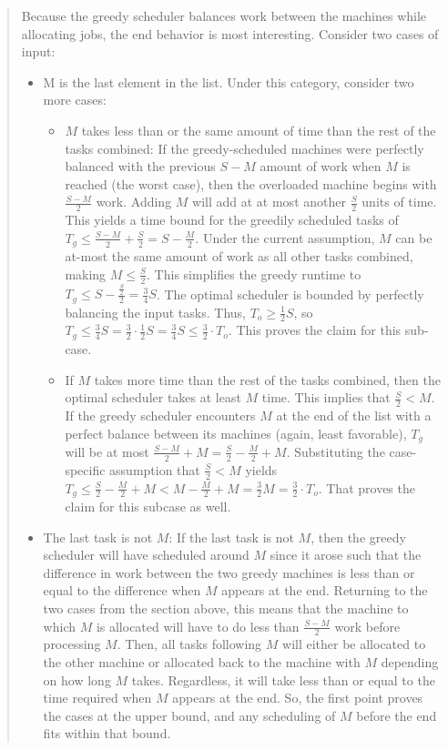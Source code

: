 \documentclass[11pt]{article}
\begin{document}
\begin{enumerate}
\begin{enumerate}
\begin{quote}
\medskip
Because the greedy scheduler balances work between the machines while allocating jobs, the end behavior is most interesting. Consider two cases of input:
\begin{itemize}
  \item M is the last element in the list. Under this category, consider two more cases: 
  \begin{itemize}
    \item $M$ takes less than or the same amount of time than the rest of the tasks combined: If the greedy-scheduled machines were perfectly balanced with the previous $S - M$ amount of work when $M$ is reached (the worst case), then the overloaded machine begins with $\frac{S - M}{2}$ work. Adding $M$ will add at at most another $\frac{S}{2}$ units of time. This yields a time bound for the greedily scheduled tasks of $T_g \leq \frac{S - M}{2} + \frac{S}{2} = S - \frac{M}{2}$. Under the current assumption, $M$ can be at-most the same amount of work as all other tasks combined, making $M \leq \frac{S}{2}$. This simplifies the greedy runtime to $T_g \leq S - \frac{\frac{S}{2}}{2} = \frac{3}{4}S$. The optimal scheduler is bounded by perfectly balancing the input tasks. Thus, $T_o \geq \frac{1}{2}S$, so $T_g \leq \frac{3}{4}S = \frac{3}{2} \cdot \frac{1}{2}S = \frac{3}{4}S \leq \frac{3}{2} \cdot T_o$. This proves the claim for this sub-case.
    \item If $M$ takes more time than the rest of the tasks combined, then the optimal scheduler takes at least $M$ time. This implies that $\frac{S}{2} < M$. If the greedy scheduler encounters $M$ at the end of the list with a perfect balance between its machines (again, least favorable), $T_g$ will be at most $\frac{S - M}{2} + M = \frac{S}{2} - \frac{M}{2} + M$. Substituting the case-specific assumption that $\frac{S}{2} < M$ yields $T_g \leq \frac{S}{2} - \frac{M}{2} + M < M - \frac{M}{2} + M = \frac{3}{2}M = \frac{3}{2} \cdot T_o$. That proves the claim for this subcase as well. 
  \end{itemize}
\item The last task is not $M$: If the last task is not $M$, then the greedy scheduler will have scheduled around $M$ since it arose such that the difference in work between the two greedy machines is less than or equal to the difference when $M$ appears at the end. Returning to the two cases from the section above, this means that the machine to which $M$ is allocated will have to do less than $\frac{S - M}{2}$ work before processing $M$. Then, all tasks following $M$ will either be allocated to the other machine or allocated back to the machine with $M$ depending on how long $M$ takes. Regardless, it will take less than or equal to the time required when $M$ appears at the end. So, the first point proves the cases at the upper bound, and any scheduling of $M$ before the end fits within that bound. 

\end{itemize}
\end{quote}
\end{enumerate}
\end{enumerate}
\end{document}

